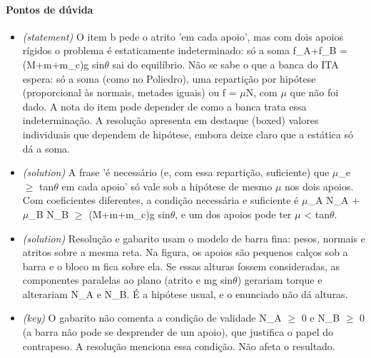 \documentclass{article}%
\begin{document}
\paragraph{Pontos de dúvida}%
\begin{itemize}%
\item%
\textit{(statement)} O item b pede o atrito 'em cada apoio', mas com dois apoios rígidos o problema é estaticamente indeterminado: só a soma f\_A+f\_B = (M+m+m\_c)g sin$\theta$ sai do equilíbrio. Não se sabe o que a banca do ITA espera: só a soma (como no Poliedro), uma repartição por hipótese (proporcional às normais, metades iguais) ou f = $\mu$N, com $\mu$ que não foi dado. A nota do item pode depender de como a banca trata essa indeterminação. A resolução apresenta em destaque (boxed) valores individuais que dependem de hipótese, embora deixe claro que a estática só dá a soma.%
\item%
\textit{(solution)} A frase 'é necessário (e, com essa repartição, suficiente) que $\mu$\_e $\geq$ tan$\theta$ em cada apoio' só vale sob a hipótese de mesmo $\mu$ nos dois apoios. Com coeficientes diferentes, a condição necessária e suficiente é $\mu$\_A N\_A + $\mu$\_B N\_B $\geq$ (M+m+m\_c)g sin$\theta$, e um dos apoios pode ter $\mu$ < tan$\theta$.%
\item%
\textit{(solution)} Resolução e gabarito usam o modelo de barra fina: pesos, normais e atritos sobre a mesma reta. Na figura, os apoios são pequenos calços sob a barra e o bloco m fica sobre ela. Se essas alturas fossem consideradas, as componentes paralelas ao plano (atrito e mg sin$\theta$) gerariam torque e alterariam N\_A e N\_B. É a hipótese usual, e o enunciado não dá alturas.%
\item%
\textit{(key)} O gabarito não comenta a condição de validade N\_A $\geq$ 0 e N\_B $\geq$ 0 (a barra não pode se desprender de um apoio), que justifica o papel do contrapeso. A resolução menciona essa condição. Não afeta o resultado.%
\end{itemize}%
\end{document}
